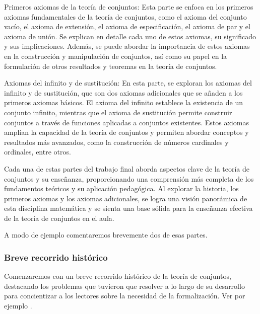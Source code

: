 Primeros axiomas de la teoría de conjuntos: Esta parte se enfoca en los primeros axiomas fundamentales de la teoría de conjuntos, como el axioma del conjunto vacío, el axioma de extensión, el axioma de especificación, el axioma de par y el axioma de unión. Se explican en detalle cada uno de estos axiomas, su significado y sus implicaciones. Además, se puede abordar la importancia de estos axiomas en la construcción y manipulación de conjuntos, así como su papel en la formulación de otros resultados y teoremas en la teoría de conjuntos.

Axiomas del infinito y de sustitución: En esta parte, se exploran los axiomas del infinito y de sustitución, que son dos axiomas adicionales que se añaden a los primeros axiomas básicos. El axioma del infinito establece la existencia de un conjunto infinito, mientras que el axioma de sustitución permite construir conjuntos a través de funciones aplicadas a conjuntos existentes. Estos axiomas amplían la capacidad de la teoría de conjuntos y permiten abordar conceptos y resultados más avanzados, como la construcción de números cardinales y ordinales, entre otros.

Cada una de estas partes del trabajo final aborda aspectos clave de la teoría de conjuntos y su enseñanza, proporcionando una comprensión más completa de los fundamentos teóricos y su aplicación pedagógica. Al explorar la historia, los primeros axiomas y los axiomas adicionales, se logra una visión panorámica de esta disciplina matemática y se sienta una base sólida para la enseñanza efectiva de la teoría de conjuntos en el aula.

A modo de ejemplo comentaremos brevemente dos de esas partes.

\subsubsection{Breve recorrido histórico}

Comenzaremos con un breve recorrido histórico de la teoría de conjuntos, destacando los problemas que tuvieron que resolver a lo largo de su desarrollo para concientizar a los lectores sobre la necesidad de la formalización. Ver por ejemplo \textcite{boyer1999historia}.

